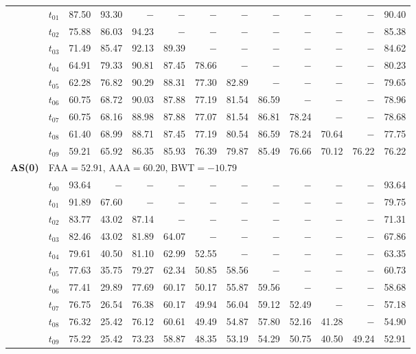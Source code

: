 \begin{table}[ht]
\begin{tabular}{@{}l l r r r r r r r r r r r@{}}
 & $t_{01}$ & 87.50 & 93.30 & $-$ & $-$ & $-$ & $-$ & $-$ & $-$ & $-$ & $-$ & 90.40 \\
 & $t_{02}$ & 75.88 & 86.03 & 94.23 & $-$ & $-$ & $-$ & $-$ & $-$ & $-$ & $-$ & 85.38 \\
 & $t_{03}$ & 71.49 & 85.47 & 92.13 & 89.39 & $-$ & $-$ & $-$ & $-$ & $-$ & $-$ & 84.62 \\
 & $t_{04}$ & 64.91 & 79.33 & 90.81 & 87.45 & 78.66 & $-$ & $-$ & $-$ & $-$ & $-$ & 80.23 \\
 & $t_{05}$ & 62.28 & 76.82 & 90.29 & 88.31 & 77.30 & 82.89 & $-$ & $-$ & $-$ & $-$ & 79.65 \\
 & $t_{06}$ & 60.75 & 68.72 & 90.03 & 87.88 & 77.19 & 81.54 & 86.59 & $-$ & $-$ & $-$ & 78.96 \\
 & $t_{07}$ & 60.75 & 68.16 & 88.98 & 87.88 & 77.07 & 81.54 & 86.81 & 78.24 & $-$ & $-$ & 78.68 \\
 & $t_{08}$ & 61.40 & 68.99 & 88.71 & 87.45 & 77.19 & 80.54 & 86.59 & 78.24 & 70.64 & $-$ & 77.75 \\
 & $t_{09}$ & 59.21 & 65.92 & 86.35 & 85.93 & 76.39 & 79.87 & 85.49 & 76.66 & 70.12 & 76.22 & 76.22 \\
\midrule
\multirow{11}{*}{\textbf{AS(0)}} & \multicolumn{12}{l}{\quad\small FAA$=52.91$,\; AAA$=60.20$,\; BWT$=-10.79$} \\
 & $t_{00}$ & 93.64 & $-$ & $-$ & $-$ & $-$ & $-$ & $-$ & $-$ & $-$ & $-$ & 93.64 \\
 & $t_{01}$ & 91.89 & 67.60 & $-$ & $-$ & $-$ & $-$ & $-$ & $-$ & $-$ & $-$ & 79.75 \\
 & $t_{02}$ & 83.77 & 43.02 & 87.14 & $-$ & $-$ & $-$ & $-$ & $-$ & $-$ & $-$ & 71.31 \\
 & $t_{03}$ & 82.46 & 43.02 & 81.89 & 64.07 & $-$ & $-$ & $-$ & $-$ & $-$ & $-$ & 67.86 \\
 & $t_{04}$ & 79.61 & 40.50 & 81.10 & 62.99 & 52.55 & $-$ & $-$ & $-$ & $-$ & $-$ & 63.35 \\
 & $t_{05}$ & 77.63 & 35.75 & 79.27 & 62.34 & 50.85 & 58.56 & $-$ & $-$ & $-$ & $-$ & 60.73 \\
 & $t_{06}$ & 77.41 & 29.89 & 77.69 & 60.17 & 50.17 & 55.87 & 59.56 & $-$ & $-$ & $-$ & 58.68 \\
 & $t_{07}$ & 76.75 & 26.54 & 76.38 & 60.17 & 49.94 & 56.04 & 59.12 & 52.49 & $-$ & $-$ & 57.18 \\
 & $t_{08}$ & 76.32 & 25.42 & 76.12 & 60.61 & 49.49 & 54.87 & 57.80 & 52.16 & 41.28 & $-$ & 54.90 \\
 & $t_{09}$ & 75.22 & 25.42 & 73.23 & 58.87 & 48.35 & 53.19 & 54.29 & 50.75 & 40.50 & 49.24 & 52.91 \\

\end{tabular}
\end{table}

